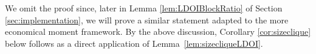 \documentclass[11pt]{article}
\makeatletter
\newcommand{\N}{\ensuremath{\mathbb{N}}}   %
\newcommand{\supp}{\text{\rm supp}}
\newcommand{\ui}{\underline{i}}
\newcommand{\uj}{\underline{j}}
\theoremstyle{plain}
\renewenvironment{proof}[1][\proofname]{%
  \par
  \pushQED{}%
  \normalfont
  \topsep6\p@\@plus6\p@
  \trivlist
  \item[\hskip\labelsep\itshape #1\@addpunct{.}]%
}{%
  \popQED
  \endtrivlist
}
\makeatother
\begin{document}


We omit the proof    since, later in Lemma \ref{lem:LDOIBlockRatio} of Section \ref{sec:implementation},
we will prove a  similar statement adapted to the more economical moment framework. 
By the above discussion, Corollary \ref{cor:sizeclique} below follows as a direct application of Lemma~\ref{lem:sizecliqueLDOI}.
\end{document}
